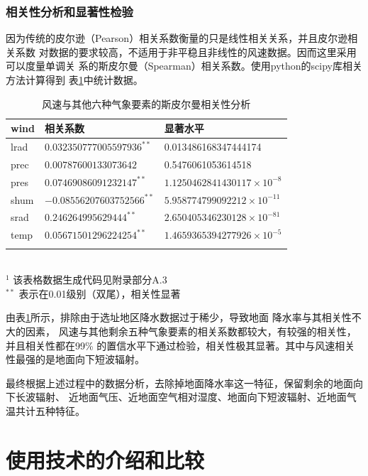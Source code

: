\documentclass[AutoFakeBold]{LZUThesis}
\begin{document}
\subsection{相关性分析和显著性检验}
因为传统的皮尔逊（Pearson）相关系数衡量的只是线性相关关系，并且皮尔逊相关系数
对数据的要求较高，不适用于非平稳且非线性的风速数据。因而这里采用可以度量单调关
系的斯皮尔曼（Spearman）相关系数。使用python的scipy库相关方法计算得到
表\ref{relativity-analysis}中统计数据。

\begin{table}[H]
    \centering
    \caption{风速与其他六种气象要素的斯皮尔曼相关性分析}
    \begin{tabular}{lll}
    \toprule
    wind & 相关系数 & 显著水平 \\
    \midrule
    lrad & $0.032350777005597936^{**}$ & 0.013486168347444174 \\
    prec & $0.00787600133073642$ & 0.5476061053614518 \\
    pres & $0.07469086091232147^{**}$ & $1.1250462841430117\times10^{-8}$ \\
    shum & $-0.08556207603752566^{**}$ & $5.958774799092212\times10^{-11}$ \\
    srad & $0.246264995629444^{**}$ & $2.650405346230128\times10^{-81}$ \\
    temp & $0.05671501296224254^{**}$ & $1.4659365394277926\times10^{-5}$ \\
    \bottomrule \\
    \end{tabular} \\
    \footnotesize{$^1$ 该表格数据生成代码见附录部分A.3} \\
    \footnotesize{$^{**}$ 表示在0.01级别（双尾），相关性显著} \\
    \label{relativity-analysis}
\end{table}

由表\ref{relativity-analysis}所示，排除由于选址地区降水数据过于稀少，导致地面
降水率与其相关性不大的因素，
风速与其他剩余五种气象要素的相关系数都较大，有较强的相关性，并且相关性都在99\%
的置信水平下通过检验，相关性极其显著。其中与风速相关性最强的是地面向下短波辐射。

最终根据上述过程中的数据分析，去除掉地面降水率这一特征，保留剩余的地面向下长波辐射、
近地面气压、近地面空气相对湿度、地面向下短波辐射、近地面气温共计五种特征。


\chapter{使用技术的介绍和比较}
\end{document}
